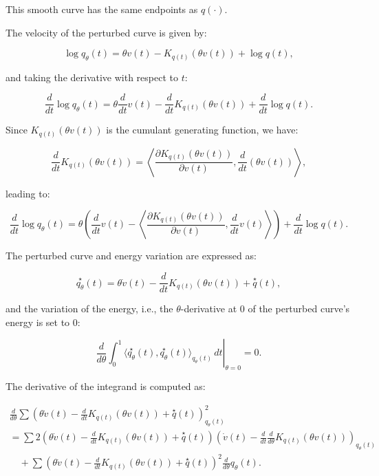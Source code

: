 \documentclass[axioms,article,submit,pdftex,moreauthors]{Definitions/mdpi}
\theoremstyle{plain}
\theoremstyle{remark}
\begin{document}
This smooth curve has the same endpoints as \( q(\cdot) \).

The velocity of the perturbed curve is given by:

\begin{equation*} 
\log q_{\theta}(t) = \theta v(t) - K_{q(t)}(\theta v(t)) + \log q(t),
\end{equation*} 

and taking the derivative with respect to \( t \):

\begin{equation*} 
\frac{d}{dt} \log q_{\theta}(t) = \theta \frac{d}{dt} v(t) - \frac{d}{dt} K_{q(t)}(\theta v(t)) + \frac{d}{dt} \log q(t).
\end{equation*} 

Since \( K_{q(t)}(\theta v(t)) \) is the cumulant generating function, we have:

\begin{equation*} 
\frac{d}{dt} K_{q(t)}(\theta v(t)) = \left\langle \frac{\partial K_{q(t)}(\theta v(t))}{\partial v(t)}, \frac{d}{dt} (\theta v(t)) \right\rangle,
\end{equation*} 

leading to:

\begin{equation*} 
\frac{d}{dt} \log q_{\theta}(t) = \theta \left( \frac{d}{dt} v(t) - \left\langle \frac{\partial K_{q(t)}(\theta v(t))}{\partial v(t)}, \frac{d}{dt} v(t) \right\rangle \right) + \frac{d}{dt} \log q(t).
\end{equation*} 

The perturbed curve and energy variation are expressed as:

\begin{equation*} 
\overset{\star}{q_\theta}(t) = \theta \dot{v}(t) - \frac{d}{dt} K_{q(t)}(\theta v(t)) + \overset{\star}{q}(t),
\end{equation*} 

and the variation of the energy, i.e., the \(\theta\)-derivative at 0 of the perturbed curve’s energy is set to 0:

\begin{equation*} 
\left. \frac{d}{d\theta} \int_0^1 \langle \overset{\star}{q_\theta}(t), \overset{\star}{q_\theta}(t) \rangle_{q_\theta(t)} \, dt \right|_{\theta=0} = 0.
\end{equation*} 

The derivative of the integrand is computed as:

\begin{multline*}
\frac{d}{d\theta} \sum \left( \theta \dot{v}(t) - \frac{d}{dt} K_{q(t)}(\theta v(t)) + \overset{\star}{q}(t) \right)^2_{q_\theta(t)} \\
= \sum 2 \left( \theta \dot{v}(t) -  \frac{d}{dt} K_{q(t)}(\theta v(t)) + \overset{\star}{q}(t) \right) \left( \dot{v}(t) - \frac{d}{dt} \frac{d}{d\theta} K_{q(t)}(\theta v(t)) \right)_{q_\theta(t)} \\
\quad + \sum \left( \theta \dot{v}(t) - \frac{d}{dt} K_{q(t)}(\theta v(t)) + \overset{\star}{q}(t) \right)^2 \frac{d}{d\theta} q_\theta(t).
\end{multline*}
\end{document}

